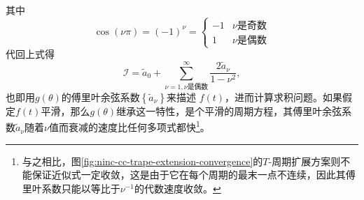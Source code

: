 其中
\begin{equation*}
  \cos \left( \nu \pi \right)
  = \left( -1 \right)^{\nu}
  = \begin{cases}
    -1 & \nu\text{是奇数} \\
    1 & \nu\text{是偶数}
  \end{cases}
\end{equation*}
代回上式得
\begin{equation}
  \label{eq:ninc-cc-rule-transform-problem-g-cos-a}
  \mathcal{I} = \tilde{a}_{0} + \sum_{\nu = 1, \nu \text{是偶数}}^{\infty} \frac{2 \tilde{a}_{\nu}}{1 - \nu^{2}},
\end{equation}
也即用$g(\theta)$的傅里叶余弦系数$\left\{ \tilde{a}_{\nu} \right\}$来描述 $f(t)$，进而计算求积问题。如果假定$f(t)$平滑，那么$g(\theta)$继承这一特性，是个平滑的周期方程，其傅里叶余弦系数$\tilde{a}_{\nu}$随着$\nu$值而衰减的速度比任何多项式都快\label{footnote:fanganbijiao}\footnote{与之相比，图\ref{fig:ninc-cc-trape-extension-convergence}的$T$-周期扩展方案则不能保证近似式一定收敛，这是由于它在每个周期的最末一点不连续，因此其傅里叶系数只能以等比于$\nu^{-1}$的代数速度收敛。}。

